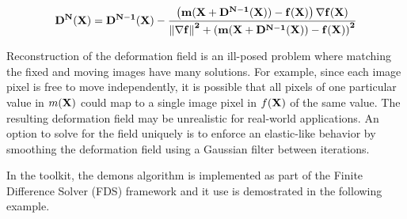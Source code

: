 \begin{equation}
\bf{D}^{N}(\bf{X}) = \bf{D}^{N-1}(\bf{X}) - \frac
{\left(  m(\bf{X}+ \bf{D}^{N-1}(\bf{X})) 
- f(\bf{X}) \right) \nabla f(\bf{X})}
{\left\|  \nabla f \right\|^2 + \left(  
m(\bf{X}+ \bf{D}^{N-1}(\bf{X}) )
 - f(\bf{X}) \right)^2 } 
\label{eqn:DemonsUpdateEquation}
\end{equation}

Reconstruction of the deformation field is an ill-posed problem where matching the
fixed and moving images have many solutions. For example, since each image pixel
is free to move independently, it is possible that all pixels of one particular
value in $m(\bf{X})$ could map to a single image pixel in $f(\bf{X})$
of the same value. The resulting deformation field may be unrealistic for real-world
applications. An option to solve for the field uniquely is to enforce an 
elastic-like behavior by smoothing the deformation field using a Gaussian filter 
between iterations.

In the toolkit, the demons algorithm is implemented as part of the Finite Difference
Solver (FDS) framework and it use is demostrated in the following example.

 

